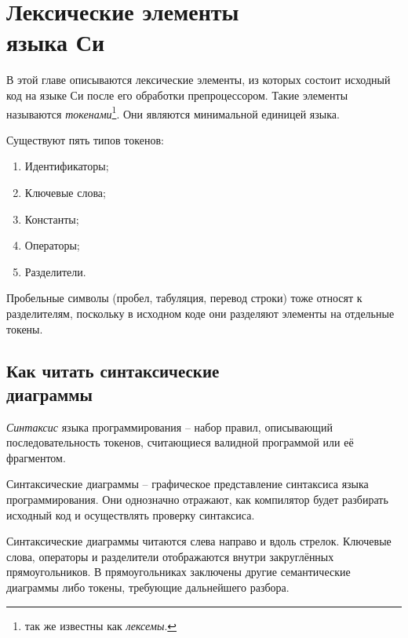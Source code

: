 \documentclass[myc.tex]{subfiles}
\begin{document}
\chapter[Лексические элементы языка Си]{Лексические элементы\\ языка Си}
В этой главе описываются лексические элементы, из которых состоит исходный код на языке Си после его обработки препроцессором. Такие элементы называются \textit{токенами}\footnote{так же известны как \textit{лексемы}.}. Они являются минимальной единицей языка.

Существуют пять типов токенов:
\begin{enumerate}
\item Идентификаторы;
\item Ключевые слова;
\item Константы;
\item Операторы;
\item Разделители.
\end{enumerate}

Пробельные символы (пробел, табуляция, перевод строки) тоже относят к разделителям, поскольку в исходном коде они разделяют элементы на отдельные токены.
















\section*{Как читать синтаксические\\ диаграммы}

\textit{Синтаксис} языка программирования -- набор правил, описывающий последовательность токенов, считающиеся валидной программой или её фрагментом.

Синтаксические диаграммы -- графическое представление синтаксиса языка программирования. Они однозначно отражают, как компилятор будет разбирать исходный код и осуществлять проверку синтаксиса.

Синтаксические диаграммы читаются слева направо и вдоль стрелок. Ключевые слова, операторы и разделители отображаются внутри закруглённых прямоугольников. В прямоугольниках заключены другие семантические диаграммы либо токены, требующие дальнейшего разбора.
\end{document}
